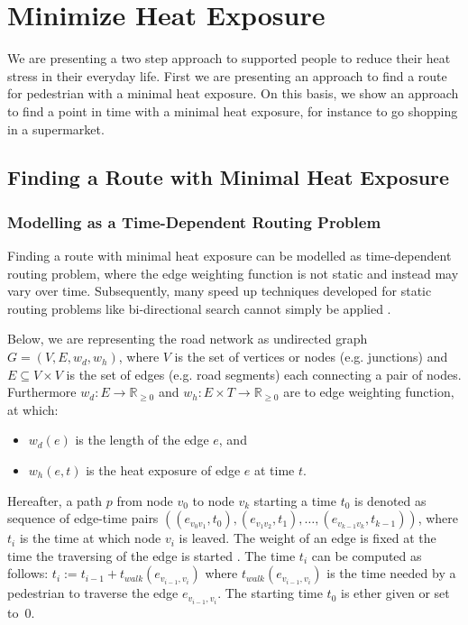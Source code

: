 
\section{Minimize Heat Exposure}

We are presenting a two step approach to supported people to reduce their heat stress in their everyday life. First we are presenting an approach to find a route for pedestrian with a minimal heat exposure. On this basis, we show an approach to find a point in time with a minimal heat exposure, for instance to go shopping in a supermarket.

\subsection{Finding a Route with Minimal Heat Exposure}

\subsubsection{Modelling as a Time-Dependent Routing Problem}

Finding a route with minimal heat exposure can be modelled as time-dependent routing problem, where the edge weighting function is not static and instead may vary over time. Subsequently, many speed up techniques developed for static routing problems like bi-directional search cannot simply be applied \parencite{Delling2009}. 

Below, we are representing the road network as undirected graph $G=(V,E,w_d,w_h)$, where $V$ is the set of vertices or nodes (e.g. junctions) and $E\subseteq V\times V$ is the set of edges (e.g. road segments) each connecting a pair of nodes. Furthermore $w_d: E \to \mathbb{R}_{\geq 0}$ and $w_h: E \times T \to \mathbb{R}_{\geq 0}$ are to edge weighting function, at which:
\begin{itemize}
	\item $w_d(e)$ is the length of the edge $e$, and
	\item $w_h(e, t)$ is the heat exposure of edge $e$ at time $t$.
\end{itemize}   
Hereafter, a path $p$ from node $v_0$ to node $v_k$ starting a time $t_0$ is denoted as sequence of edge-time pairs $((e_{v_0v_1},t_0),(e_{v_1v_2},t_1),\dots, (e_{v_{k-1}v_k},t_{k-1}))$, where $t_i$ is the time at which node $v_i$ is leaved. The weight of an edge is fixed at the time the traversing of the edge is started \parencite[the so-called frozen link model,][]{Orda1990}. The time $t_i$ can be computed as follows: $t_i := t_{i-1} + t_{walk}(e_{v_{i-1},v_i})$ where $t_{walk}(e_{v_{i-1},v_i})$ is the time needed by a pedestrian to traverse the edge $e_{v_{i-1},v_i}$. The starting time $t_0$ is ether given or set to~$0$. 

